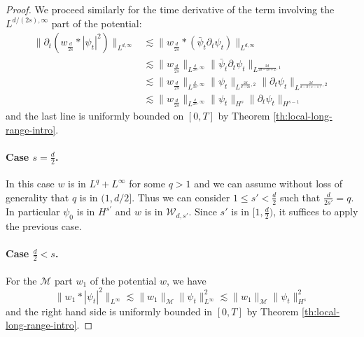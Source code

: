 \documentclass[12pt]{article}
\theoremstyle{plain}
\newcommand{\meas}{\mathcal{M}}
\begin{document}
\begin{proof}
   

   We proceed similarly for the time derivative of the term involving the $L^{d/(2s),\infty}$ part of the potential:
   \begin{align*}
       \|\partial_t(w_{\frac{d}{2s}}*|\psi_t|^2)\|_{L^{d,\infty}}
       &\lesssim \|w_{\frac{d}{2s}}*(\bar\psi_t \partial_t\psi_t)\|_{L^{d,\infty}} \\
       & \lesssim \|w_{\frac{d}{2s}}\|_{L^{\frac{d}{2s},\infty}} \|\bar\psi_t \partial_t\psi_t\|_{L^{\frac{2d}{2d-4s+2},1}} \\
       & \lesssim \|w_{\frac{d}{2s}}\|_{L^{\frac{d}{2s},\infty}} \|\psi_t\|_{L^{\frac{2d}{d-2s},2}} \|\partial_t\psi_t\|_{L^{\frac{2d}{d-2(s-1)},2}} \\
       & \lesssim \|w_{\frac{d}{2s}}\|_{L^{\frac{d}{2s},\infty}} \|\psi_t\|_{H^{s}} \|\partial_t\psi_t\|_{H^{s-1}}
   \end{align*}
and the last line is uniformly bounded on $[0,T]$ by Theorem \ref{th:local-long-range-intro}.

\paragraph{Case $s=\frac{d}{2}$.}
    In this case $w$ is in $L^q+L^\infty$ for some $q>1$ and we can assume without loss of generality that $q$ is in $(1,d/2]$. Thus we can consider  $1\le s'<\frac{d}{2}$ such that $\frac{d}{2s'}=q$. In particular $\psi_0$ is in $H^{s'}$ and $w$ is in $\mathcal{W}_{d,s'}$. Since $s'$ is in $[1,\frac{d}{2})$, it suffices to apply the previous case.
   
\paragraph{Case $\frac{d}{2}<s$.}
      For the $\meas$ part $w_1$ of the potential $w$, we have
   \begin{equation}
       \|w_{1}*|\psi_t|^2\|_{L^{\infty}} 
        \lesssim \|w_{1}\|_{\meas} \|\psi_t\|_{L^{\infty}}^2 \lesssim \|w_{1}\|_{\meas} \|\psi_t\|_{H^s}^2
   \end{equation}
   and the right hand side is uniformly bounded in $[0,T]$ by Theorem \ref{th:local-long-range-intro}.
   
    
    

\end{proof}
\end{document}
